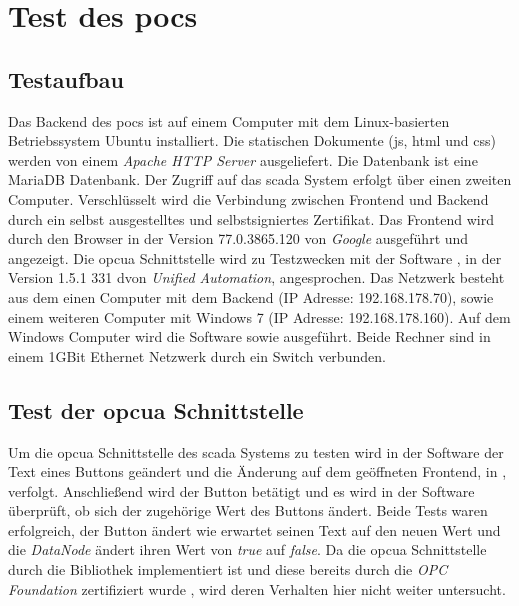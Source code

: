 \section{Test des \acp{poc} }\label{sec:poc:test}
\subsection{Testaufbau}
Das Backend des \acp{poc} ist auf einem Computer mit dem Linux-basierten Betriebssystem Ubuntu installiert. 
Die statischen Dokumente (\ac{js}, \ac{html} und \ac{css}) werden von einem \emph{Apache HTTP Server} \citep{apache} ausgeliefert.
Die Datenbank ist eine MariaDB Datenbank.
Der Zugriff auf das \ac{scada} System erfolgt über einen zweiten Computer.
Verschlüsselt wird die Verbindung zwischen Frontend und Backend durch ein selbst ausgestelltes und selbstsigniertes Zertifikat.
Das Frontend wird durch den Browser  in der Version 77.0.3865.120 von \emph{Google} ausgeführt und angezeigt.
Die \ac{opcua} Schnittstelle wird zu Testzwecken mit der Software , in der Version 1.5.1 331 dvon \emph{Unified Automation}, angesprochen.
Das Netzwerk besteht aus dem einen Computer mit dem Backend (IP Adresse: 192.168.178.70), sowie einem weiteren Computer mit Windows 7 (IP Adresse: 192.168.178.160).
Auf dem Windows Computer wird die Software  sowie  ausgeführt.
Beide Rechner sind in einem 1GBit Ethernet Netzwerk durch ein Switch verbunden.

\subsection{Test der \acs{opcua} Schnittstelle}
Um die \ac{opcua} Schnittstelle des \ac{scada} Systems zu testen 
wird in der Software  der Text eines Buttons geändert und die Änderung auf dem geöffneten Frontend, 
in , verfolgt.
Anschließend wird der Button betätigt und es wird in der Software  überprüft, ob sich der zugehörige Wert des Buttons ändert. 
Beide Tests waren erfolgreich, der Button ändert wie erwartet seinen Text auf den neuen Wert und die \emph{DataNode} ändert ihren Wert von \emph{true} auf \emph{false}.
Da die \ac{opcua} Schnittstelle durch die Bibliothek  implementiert ist und diese bereits durch die \emph{OPC Foundation} zertifiziert wurde \citep{cert62541}, wird deren Verhalten hier nicht weiter untersucht.

